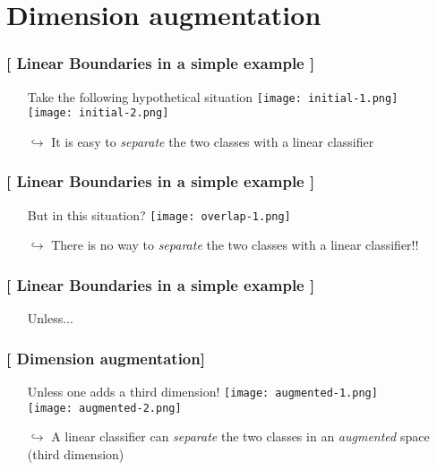 \documentclass[xcolor=x11names,compress]{beamer}
\renewcommand{\(}{\begin{columns}}
\renewcommand{\)}{\end{columns}}
\newcommand{\<}[1]{\begin{column}{#1}}
\renewcommand{\>}{\end{column}}
\begin{document}
\section{Dimension augmentation}

\begin{frame}
\frametitle{\textcolor{brique}{[ Linear Boundaries in a simple example ]}}
\pause
\begin{itemize}[<+->]
    \item[] Take the following hypothetical situation
      {\texttt{[image: initial-1.png]} \\ }
      {\texttt{[image: initial-2.png]} \\ }
    \item[$\hookrightarrow$] It is easy to \textit{separate} the two classes with a linear  classifier
\end{itemize}
\end{frame}

\begin{frame}
\frametitle{\textcolor{brique}{[ Linear Boundaries in a simple example ]}}
\pause
\begin{itemize}[<+->]
    \item[] But in this  situation?
      {\texttt{[image: overlap-1.png]} \\ }
    \item[$\hookrightarrow$] There is no way to  \textit{separate} the two classes with a linear  classifier!!
\end{itemize}
\end{frame}


\begin{frame} %
\frametitle{\textcolor{brique}{[ Linear Boundaries in a simple example ]}}
\pause
\begin{itemize}[<+->]
  \item[] \begin{center} \huge Unless... \end{center}
\end{itemize}
\end{frame}

\begin{frame}
\frametitle{\textcolor{brique}{[ Dimension augmentation]}}
\pause
\begin{itemize}[<+->]
    \item[] Unless  one adds a third dimension!
      {\texttt{[image: augmented-1.png]} \\ }
      {\texttt{[image: augmented-2.png]} \\ }
    \item[$\hookrightarrow$] A  linear classifier can \textit{separate} the two classes  in an \textit{augmented} space (third dimension)
\end{itemize}
\end{frame}
\end{document}
